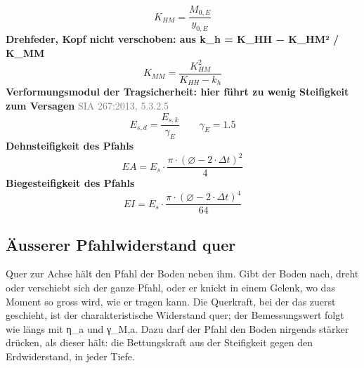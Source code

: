 \documentclass[11pt,a4paper]{article}
\newcommand{\normref}[1]{{\small\textcolor{gray}{#1}}}
\begin{document}
\begin{equation*}
K_{HM} = \frac{M_{0,E}}{y_{0,E}}
\end{equation*}
\noindent\textbf{Drehfeder, Kopf nicht verschoben: aus k\_h = K\_HH − K\_HM² / K\_MM}
\begin{equation*}
K_{MM} = \frac{K_{HM}^{2}}{K_{HH} - k_h}
\end{equation*}
\noindent\textbf{Verformungsmodul der Tragsicherheit: hier führt zu wenig Steifigkeit zum Versagen} \hfill \normref{SIA 267:2013, 5.3.2.5}
\begin{equation*}
E_{s,d} = \frac{E_{s,k}}{\gamma_E} \qquad \gamma_E = 1.5
\end{equation*}
\noindent\textbf{Dehnsteifigkeit des Pfahls}
\begin{equation*}
EA = E_s \cdot \frac{\pi \cdot \left(\varnothing - 2 \cdot \Delta t\right)^{2}}{4}
\end{equation*}
\noindent\textbf{Biegesteifigkeit des Pfahls}
\begin{equation*}
EI = E_s \cdot \frac{\pi \cdot \left(\varnothing - 2 \cdot \Delta t\right)^{4}}{64}
\end{equation*}
\subsection{Äusserer Pfahlwiderstand quer}
Quer zur Achse hält den Pfahl der Boden neben ihm. Gibt der Boden nach, dreht oder verschiebt sich der ganze Pfahl, oder er knickt in einem Gelenk, wo das Moment so gross wird, wie er tragen kann. Die Querkraft, bei der das zuerst geschieht, ist der charakteristische Widerstand quer; der Bemessungswert folgt wie längs mit η\_a und γ\_M,a. Dazu darf der Pfahl den Boden nirgends stärker drücken, als dieser hält: die Bettungskraft aus der Steifigkeit gegen den Erdwiderstand, in jeder Tiefe.
\end{document}
